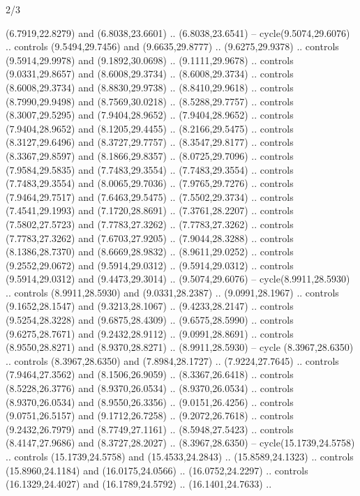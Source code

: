 \begin{flagdescription}{2/3}
{\begin{scope}[xshift=0.5\flaglength,yshift=0.5\flagwidth,scale=\flagwidth/33.602]
\begin{scope}[y=0.8pt, x=0.8pt, yscale=-1,shift={(-12,-26)}]
    (6.7919,22.8279) and (6.8038,23.6601) .. (6.8038,23.6541) -- cycle(9.5074,29.6076) ..
    controls (9.5494,29.7456) and (9.6635,29.8777) .. (9.6275,29.9378) .. controls
    (9.5914,29.9978) and (9.1892,30.0698) .. (9.1111,29.9678) .. controls
    (9.0331,29.8657) and (8.6008,29.3734) .. (8.6008,29.3734) .. controls
    (8.6008,29.3734) and (8.8830,29.9738) .. (8.8410,29.9618) .. controls
    (8.7990,29.9498) and (8.7569,30.0218) .. (8.5288,29.7757) .. controls
    (8.3007,29.5295) and (7.9404,28.9652) .. (7.9404,28.9652) .. controls
    (7.9404,28.9652) and (8.1205,29.4455) .. (8.2166,29.5475) .. controls
    (8.3127,29.6496) and (8.3727,29.7757) .. (8.3547,29.8177) .. controls
    (8.3367,29.8597) and (8.1866,29.8357) .. (8.0725,29.7096) .. controls
    (7.9584,29.5835) and (7.7483,29.3554) .. (7.7483,29.3554) .. controls
    (7.7483,29.3554) and (8.0065,29.7036) .. (7.9765,29.7276) .. controls
    (7.9464,29.7517) and (7.6463,29.5475) .. (7.5502,29.3734) .. controls
    (7.4541,29.1993) and (7.1720,28.8691) .. (7.3761,28.2207) .. controls
    (7.5802,27.5723) and (7.7783,27.3262) .. (7.7783,27.3262) .. controls
    (7.7783,27.3262) and (7.6703,27.9205) .. (7.9044,28.3288) .. controls
    (8.1386,28.7370) and (8.6669,28.9832) .. (8.9611,29.0252) .. controls
    (9.2552,29.0672) and (9.5914,29.0312) .. (9.5914,29.0312) .. controls
    (9.5914,29.0312) and (9.4473,29.3014) .. (9.5074,29.6076) -- cycle(8.9911,28.5930) ..
    controls (8.9911,28.5930) and (9.0331,28.2387) .. (9.0991,28.1967) .. controls
    (9.1652,28.1547) and (9.3213,28.1067) .. (9.4233,28.2147) .. controls
    (9.5254,28.3228) and (9.6875,28.4309) .. (9.6575,28.5990) .. controls
    (9.6275,28.7671) and (9.2432,28.9112) .. (9.0991,28.8691) .. controls
    (8.9550,28.8271) and (8.9370,28.8271) .. (8.9911,28.5930) -- cycle (8.3967,28.6350) ..
    controls (8.3967,28.6350) and (7.8984,28.1727) .. (7.9224,27.7645) .. controls
    (7.9464,27.3562) and (8.1506,26.9059) .. (8.3367,26.6418) .. controls
    (8.5228,26.3776) and (8.9370,26.0534) .. (8.9370,26.0534) .. controls
    (8.9370,26.0534) and (8.9550,26.3356) .. (9.0151,26.4256) .. controls
    (9.0751,26.5157) and (9.1712,26.7258) .. (9.2072,26.7618) .. controls
    (9.2432,26.7979) and (8.7749,27.1161) .. (8.5948,27.5423) .. controls
    (8.4147,27.9686) and (8.3727,28.2027) .. (8.3967,28.6350) -- cycle(15.1739,24.5758) ..
    controls (15.1739,24.5758) and (15.4533,24.2843) .. (15.8589,24.1323) ..
    controls (15.8960,24.1184) and (16.0175,24.0566) .. (16.0752,24.2297) ..
    controls (16.1329,24.4027) and (16.1789,24.5792) .. (16.1401,24.7633) ..

\end{scope}
\end{scope}}
\end{flagdescription}
